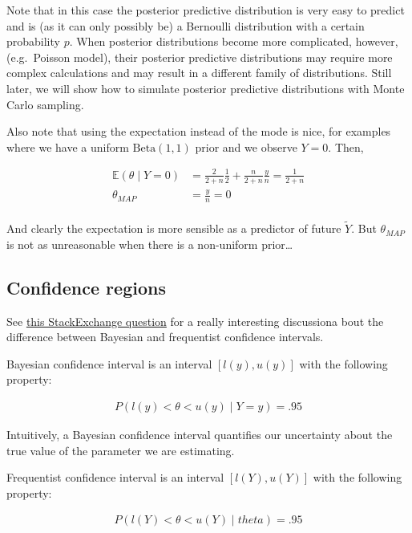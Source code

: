 \documentclass[
]{article}
\begin{document}
Note that in this case the posterior predictive distribution is very
easy to predict and is (as it can only possibly be) a Bernoulli
distribution with a certain probability \(p\). When posterior
distributions become more complicated, however, (e.g.~Poisson model),
their posterior predictive distributions may require more complex
calculations and may result in a different family of distributions.
Still later, we will show how to simulate posterior predictive
distributions with Monte Carlo sampling.

Also note that using the expectation instead of the mode is nice, for
examples where we have a uniform \(\text{Beta}(1, 1)\) prior and we
observe \(Y = 0\). Then,

\begin{align}
\mathbb{E}(\theta \mid Y = 0) &= \frac{2}{2 + n}\frac{1}{2} + \frac{n}{2 +
n}\frac{y}{n} = \frac{1}{2 + n}\\
\theta_{MAP} &= \frac{y}{n} = 0 \\
\end{align}

And clearly the expectation is more sensible as a predictor of future
\(\tilde{Y}\). But \(\theta_{MAP}\) is not as unreasonable when there is
a non-uniform prior\ldots{}

\hypertarget{confidence-regions}{%
\subsection{Confidence regions}\label{confidence-regions}}

See
\href{http://stats.stackexchange.com/questions/2272/whats-the-difference-between-a-confidence-interval-and-a-credible-interval}{this
StackExchange question} for a really interesting discussiona bout the
difference between Bayesian and frequentist confidence intervals.

Bayesian confidence interval is an interval \([l(y), u(y)]\) with the
following property:

\begin{align}
P(l(y) < \theta < u(y) \mid Y = y) = .95
\end{align}

Intuitively, a Bayesian confidence interval quantifies our uncertainty
about the true value of the parameter we are estimating.

Frequentist confidence interval is an interval \([l(Y), u(Y)]\) with the
following property:

\begin{align}
P(l(Y) < \theta < u(Y) \mid theta) = .95
\end{align}
\end{document}
